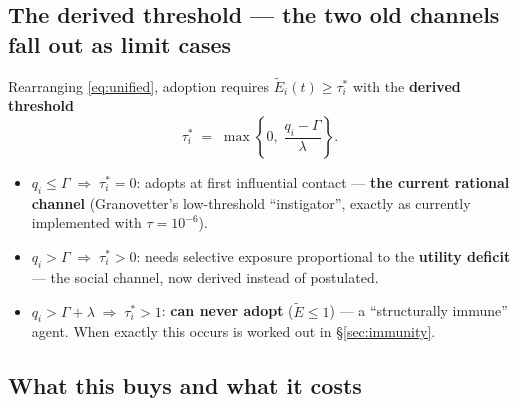 \documentclass[11pt,a4paper]{article}
\newcommand{\Ee}{\tilde{E}}                 %
\begin{document}
\subsection{The derived threshold --- the two old channels fall out as limit cases}
\label{sec:derived}

Rearranging \eqref{eq:unified}, adoption requires $\Ee_i(t) \ge \tau_i^{*}$ with the
\textbf{derived threshold}
\begin{equation}
  \tau_i^{*} \;=\; \max\!\left\{0,\; \frac{q_i - \Gamma}{\lambda}\right\}.
  \label{eq:taustar}
\end{equation}

\begin{itemize}
  \item $q_i \le \Gamma \;\Rightarrow\; \tau_i^{*} = 0$: adopts at first influential
    contact --- \textbf{the current rational channel} (Granovetter's low-threshold
    ``instigator'', exactly as currently implemented with $\tau = 10^{-6}$).
  \item $q_i > \Gamma \;\Rightarrow\; \tau_i^{*} > 0$: needs selective exposure
    proportional to the \textbf{utility deficit} --- the social channel, now derived
    instead of postulated.
  \item $q_i > \Gamma + \lambda \;\Rightarrow\; \tau_i^{*} > 1$: \textbf{can never adopt}
    ($\Ee \le 1$) --- a ``structurally immune'' agent. When exactly this occurs is worked
    out in \S\ref{sec:immunity}.
\end{itemize}

\subsection{What this buys and what it costs}
\label{sec:buys}
\end{document}
